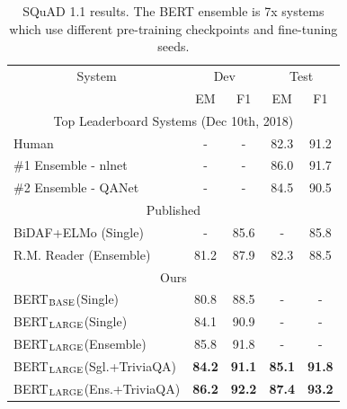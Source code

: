 \documentclass[11pt,a4paper]{article}
\newcommand\bertbase{BERT$_{\small \textsc{BASE}}$\xspace}
\newcommand\bertlarge{BERT$_{\small \textsc{LARGE}}$\xspace}
\begin{document}

\begin{table}[t]
\begin{center}
{\small
\begin{tabular}{@{}lcccc@{}}
  \toprule
  \multicolumn{1}{c}{System} & \multicolumn{2}{c}{Dev} & \multicolumn{2}{c}{Test} \\
  & EM & F1 & EM & F1 \\
  \midrule

  \multicolumn{5}{c}{Top Leaderboard Systems (Dec 10th, 2018)} \\
  Human                & - & - & 82.3 & 91.2 \\ 
  \#1 Ensemble - nlnet & - & - & 86.0 & 91.7 \\ 
  \#2 Ensemble - QANet & - & - & 84.5 & 90.5 \\ 
  \midrule
  \multicolumn{5}{c}{Published}     \\
 BiDAF+ELMo (Single)    & -    & 85.6  & -     & 85.8    \\ 
 R.M. Reader (Ensemble) & 81.2 & 87.9  & 82.3  & 88.5 \\ 
  \midrule
  \multicolumn{5}{c}{Ours} \\
  \bertbase (Single)     & 80.8 & 88.5 & -   & - \\ 
  \bertlarge (Single)    & 84.1 & 90.9 & -   & - \\ 
  \bertlarge (Ensemble)  & 85.8 & 91.8 & -   & - \\ 
  \bertlarge (Sgl.+TriviaQA) & {\bf 84.2} & {\bf 91.1} & {\bf 85.1} & {\bf 91.8} \\ 
  \bertlarge (Ens.+TriviaQA) & {\bf 86.2} & {\bf 92.2} & {\bf 87.4} & {\bf 93.2}
 \\ 

\bottomrule
\end{tabular}
} %
\end{center}
\caption{\label{tab:squad_results} SQuAD 1.1 results. The BERT ensemble is 7x systems which use different pre-training checkpoints and fine-tuning seeds.}
\end{table}
\end{document}
